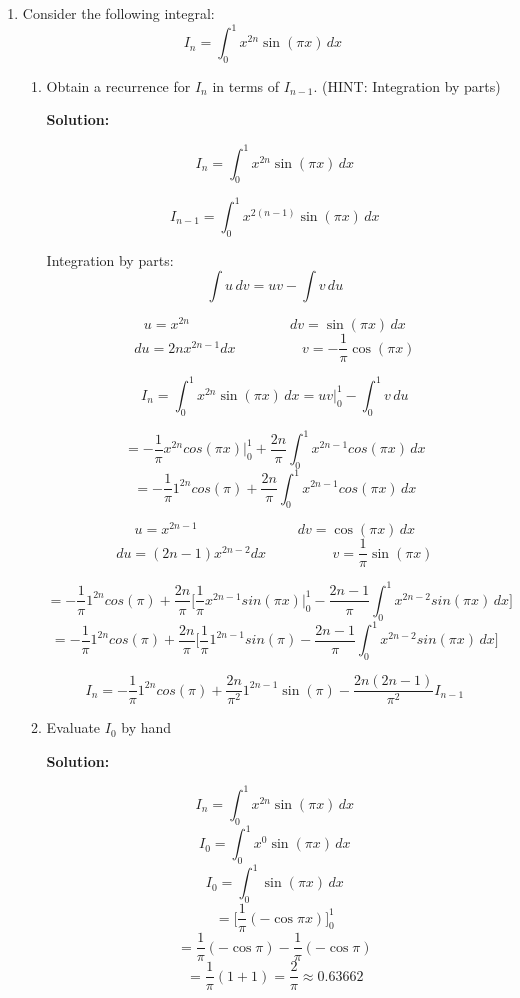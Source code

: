 \documentclass{article}
\begin{document}
\begin{enumerate}
\pagebreak

\item Consider the following integral:
    $$I_{n} = \int_{0}^{1} x^{2n} \sin(\pi x) \,  dx$$

\begin{enumerate}
\item Obtain a recurrence for $I_{n}$ in terms of $I_{n-1}$. (HINT: Integration by parts)

\textbf{Solution:}

$$I_{n} = \int_{0}^{1} x^{2n} \sin(\pi x) \, dx$$

$$I_{n-1} = \int_{0}^{1} x^{2(n-1)} \sin(\pi x) \, dx$$

Integration by parts: 
    $$\int u \, dv = uv - \int v \, du$$

        $$u = x^{2n} \hspace{3cm}  dv = \sin(\pi x) \, dx$$
        $$du = 2nx^{2n-1} dx \hspace{2cm} v = -\frac{1}{\pi} \cos(\pi x)$$


        $$I_{n} = \int_{0}^{1} x^{2n} \sin(\pi x) \,  dx = uv \bigg\rvert_{0}^{1} - \int_{0}^{1} v \, du$$

        $$= - \frac{1}{\pi} x^{2n} cos(\pi x) \bigg\rvert_{0}^{1} + \frac{2n}{\pi} \int_{0}^{1} x^{2n-1} cos(\pi x) \, dx$$
        $$= - \frac{1}{\pi} 1^{2n} cos(\pi) + \frac{2n}{\pi} \int_{0}^{1} x^{2n-1} cos(\pi x) \, dx$$

        $$u = x^{2n-1} \hspace{3cm}  dv = \cos(\pi x) \, dx$$
        $$du = (2n-1)x^{2n-2} dx \hspace{2cm} v = \frac{1}{\pi} \sin(\pi x)$$

        $$= - \frac{1}{\pi} 1^{2n} cos(\pi) + \frac{2n}{\pi} \bigg[ \frac{1}{\pi} x^{2n-1} sin(\pi x) \bigg\rvert_{0}^{1} - \frac{2n-1}{\pi} \int_{0}^{1} x^{2n-2} sin(\pi x) \, dx \bigg]$$
        $$= - \frac{1}{\pi} 1^{2n} cos(\pi) + \frac{2n}{\pi} \bigg[ \frac{1}{\pi} 1^{2n-1} sin(\pi) - \frac{2n-1}{\pi} \int_{0}^{1} x^{2n-2} sin(\pi x) \, dx \bigg]$$

        $$I_{n} = - \frac{1}{\pi} 1^{2n} cos(\pi) + \frac{2n}{\pi^{2}} 1^{2n-1} \sin(\pi) - \frac{2n(2n-1)}{\pi^{2}} I_{n-1}$$

        \vspace{2cm}

\item Evaluate $I_{0}$ by hand

    \textbf{Solution:}

        $$I_{n} = \int_{0}^{1} x^{2n} \sin(\pi x) \, dx$$
        $$I_{0} = \int_{0}^{1} x^{0} \sin(\pi x) \, dx$$
        $$I_{0} = \int_{0}^{1} \sin(\pi x) \, dx$$
        $$= \bigg[ \frac{1}{\pi} (-\cos \pi x) \bigg]_{0}^{1}$$
        $$ = \frac{1}{\pi} (-\cos \pi) - \frac{1}{\pi} (-\cos \pi)$$
        $$ = \frac{1}{\pi} (1 + 1) = \frac{2}{\pi} \approx 0.63662$$


\end{enumerate}
\end{enumerate}
\end{document}
